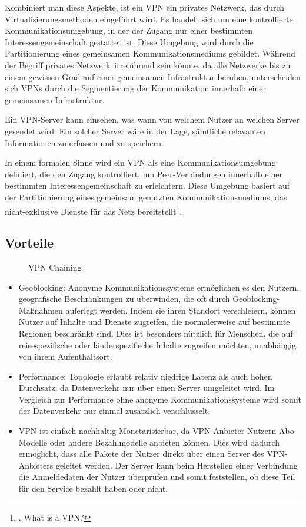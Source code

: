 Kombiniert man diese Aspekte, ist ein VPN ein privates Netzwerk, das durch Virtualisierungsmethoden eingeführt wird. Es handelt sich um eine kontrollierte Kommunikationsumgebung, in der der Zugang nur einer bestimmten Interessengemeinschaft gestattet ist. Diese Umgebung wird durch die Partitionierung eines gemeinsamen Kommunikationsmediums gebildet. Während der Begriff \glqq privates Netzwerk\grqq\ irreführend sein könnte, da alle Netzwerke bis zu einem gewissen Grad auf einer gemeinsamen Infrastruktur beruhen, unterscheiden sich VPNs durch die Segmentierung der Kommunikation innerhalb einer gemeinsamen Infrastruktur.

Ein VPN-Server kann einsehen, was wann von welchem Nutzer an welchen Server gesendet wird. Ein solcher Server wäre in der Lage, sämtliche relavanten Informationen zu erfassen und zu speichern.

In einem formalen Sinne wird ein VPN als eine Kommunikationsumgebung definiert, die den Zugang kontrolliert, um Peer-Verbindungen innerhalb einer bestimmten Interessengemeinschaft zu erleichtern. Diese Umgebung basiert auf der Partitionierung eines gemeinsam genutzten Kommunikationsmediums, das nicht-exklusive Dienste für das Netz bereitstellt\footnote{\cite{DefinitionOfVPN}, What is a VPN?}.

\subsection{Vorteile}

\begin{figure}[h!]
    \centering
    
    \caption{VPN Chaining}
    \label{imgs:vpn_chaining}
\end{figure}

\begin{itemize}
    \item Geoblocking: Anonyme Kommunikationssysteme ermöglichen es den Nutzern, geografische Beschränkungen zu überwinden, die oft durch Geoblocking-Maßnahmen auferlegt werden. Indem sie ihren Standort verschleiern, können Nutzer auf Inhalte und Dienste zugreifen, die normalerweise auf bestimmte Regionen beschränkt sind. Dies ist besonders nützlich für Menschen, die auf reisespezifische oder länderspezifische Inhalte zugreifen möchten, unabhängig von ihrem Aufenthaltsort.
    \item Performance: Topologie erlaubt relativ niedrige Latenz als auch hohen Durchsatz, da Datenverkehr nur über einen Server umgeleitet wird. Im Vergleich zur Performance ohne anonyme Kommunikationssysteme wird somit der Datenverkehr nur einmal zusätzlich verschlüsselt.
    \item VPN ist einfach nachhaltig Monetarisierbar, da VPN Anbieter Nutzern Abo-Modelle oder andere Bezahlmodelle anbieten können. Dies wird dadurch ermöglicht, dass alle Pakete der Nutzer direkt über einen Server des VPN-Anbieters geleitet werden. Der Server kann beim Herstellen einer Verbindung die Anmeldedaten der Nutzer überprüfen und somit feststellen, ob diese Teil für den Service bezahlt haben oder nicht.
\end{itemize}

